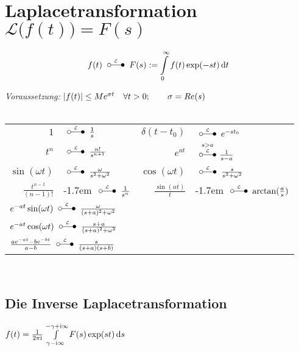 \documentclass[german,color,5pt]{latex4ei/latex4ei_fs}
\begin{document}
\section{Laplacetransformation \quad $\mathcal L\bigl(f(t)\bigr) = F(s)$}
\begin{sectionbox}
	\begin{emphbox}\vspace{-5pt}
		\[f(t) \LT F(s) := \int\limits_0^\infty f(t) \exp(-st) \diff t\]
	\end{emphbox}
	\emph{Voraussetzung:} $\left\vert f(t)\right\vert \leq M e^{\sigma t} \quad \forall t > 0; \qquad \sigma = Re(s)$\\
	\\
	\everymath{\displaystyle}	%
	\begin{tabular}{rl|rl}
		$1$ & \!\!\!\!\!\!\!\!\!\!$\LT \frac{1}{s}$ & $\delta(t-t_0)$ & \!\!\!\!\!\!\!\!\!\!$\LT e^{-s t_0}$\\[0.2em]
		$t^n$ & \!\!\!\!\!\!\!\!\!\!$\LT \frac{n!}{s^{n+1}}$ & $e^{at}$  & \!\!\!\!\!\!\!\!\!\!$\overset{s > a}{ \LT } \frac{1}{s-a}$\\[0.5em] 
		$\sin(\omega t)$ & \!\!\!\!\!\!\!\!\!\!$\LT \frac{\omega}{s^2 + \omega^2}$ & $\cos(\omega t)$ & \!\!\!\!\!\!\!\!\!\!$\LT \frac{s}{s^2 + \omega^2}$\\[0.5em]
		$\frac{t^{n-1}}{(n-1)!}$   & \kern-1.7em $\LT \frac{1}{s^n}$ & $\frac{\sin(at)}{t}$ & \kern-1.7em $\LT\arctan(\frac{a}{s})$\\[0.5em]
		\multicolumn{4}{l}{ $e^{-at} \sin(\omega t) \LT \frac{\omega}{(s+a)^2+\omega^2}$} \\
		\multicolumn{4}{l}{ $e^{-at} \cos(\omega t) \LT \frac{s+a}{(s+a)^2+\omega^2}$}\\
		\multicolumn{4}{l}{$\frac{ae^{-at}-be^{-bt}}{a-b} \LT \frac{s}{(s+a)(s+b)}$}
	\end{tabular}\\
	\subsection{Die Inverse Laplacetransformation}
	$f(t) = \frac{1}{2\pi \i} \int\limits_{\gamma - \i \infty}^{-\gamma + \i \infty} F(s) \exp(st) \diff s$
	\everymath{\textstyle}
\end{sectionbox}
\end{document}
